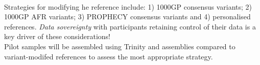 \documentclass[25pt,margin=20mm,innermargin=-6in,blockverticalspace=1mm]{tikzposter}
\begin{document}
\begin{columns}
{\begin{minipage}{\linewidth}
    \end{minipage}
    ~\\[1cm]
    Strategies for modifying he reference include: 1) 1000GP consensus variants; 2) 1000GP AFR variants; 3) PROPHECY consensus variants and 4) personalised references.
    \textit{Data sovereignty} with participants retaining control of their data is a key driver of these considerations!
    \\
    
    Pilot samples will be assembled using Trinity and assemblies compared to variant-modifed references to assess the most appropriate strategy.
    	
    }

\end{columns}
\end{document}
